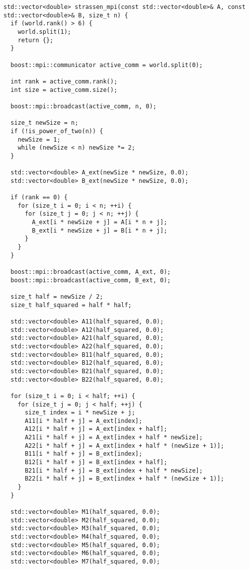 \documentclass[a4paper,12pt]{article}
\begin{document}
\begin{lstlisting}[caption={Функция strassen\_mpi}]
std::vector<double> strassen_mpi(const std::vector<double>& A, const std::vector<double>& B, size_t n) {
  if (world.rank() > 6) {
    world.split(1);
    return {};
  }

  boost::mpi::communicator active_comm = world.split(0);

  int rank = active_comm.rank();
  int size = active_comm.size();

  boost::mpi::broadcast(active_comm, n, 0);

  size_t newSize = n;
  if (!is_power_of_two(n)) {
    newSize = 1;
    while (newSize < n) newSize *= 2;
  }

  std::vector<double> A_ext(newSize * newSize, 0.0);
  std::vector<double> B_ext(newSize * newSize, 0.0);

  if (rank == 0) {
    for (size_t i = 0; i < n; ++i) {
      for (size_t j = 0; j < n; ++j) {
        A_ext[i * newSize + j] = A[i * n + j];
        B_ext[i * newSize + j] = B[i * n + j];
      }
    }
  }

  boost::mpi::broadcast(active_comm, A_ext, 0);
  boost::mpi::broadcast(active_comm, B_ext, 0);

  size_t half = newSize / 2;
  size_t half_squared = half * half;

  std::vector<double> A11(half_squared, 0.0);
  std::vector<double> A12(half_squared, 0.0);
  std::vector<double> A21(half_squared, 0.0);
  std::vector<double> A22(half_squared, 0.0);
  std::vector<double> B11(half_squared, 0.0);
  std::vector<double> B12(half_squared, 0.0);
  std::vector<double> B21(half_squared, 0.0);
  std::vector<double> B22(half_squared, 0.0);

  for (size_t i = 0; i < half; ++i) {
    for (size_t j = 0; j < half; ++j) {
      size_t index = i * newSize + j;
      A11[i * half + j] = A_ext[index];
      A12[i * half + j] = A_ext[index + half];
      A21[i * half + j] = A_ext[index + half * newSize];
      A22[i * half + j] = A_ext[index + half * (newSize + 1)];
      B11[i * half + j] = B_ext[index];
      B12[i * half + j] = B_ext[index + half];
      B21[i * half + j] = B_ext[index + half * newSize];
      B22[i * half + j] = B_ext[index + half * (newSize + 1)];
    }
  }

  std::vector<double> M1(half_squared, 0.0);
  std::vector<double> M2(half_squared, 0.0);
  std::vector<double> M3(half_squared, 0.0);
  std::vector<double> M4(half_squared, 0.0);
  std::vector<double> M5(half_squared, 0.0);
  std::vector<double> M6(half_squared, 0.0);
  std::vector<double> M7(half_squared, 0.0);


\end{lstlisting}
\end{document}
